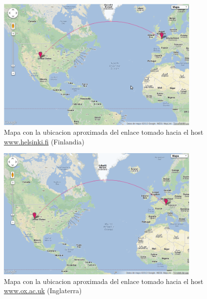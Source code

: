 \begin{figure}[H]
  \centering
    \includegraphics[width=0.9\textwidth]{imgs/finlandia_enlace_1.png}
    \caption{Mapa con la ubicacion aproximada del enlace tomado hacia el host \url{www.helsinki.fi} (Finlandia)}
    \label{fig:mapa_fin}
\end{figure}


\begin{figure}[H]
  \centering
    \includegraphics[width=0.9\textwidth]{imgs/inglaterra_enlace_1.png}
    \caption{Mapa con la ubicacion aproximada del enlace tomado hacia el host \url{www.ox.ac.uk} (Inglaterra)}
    \label{fig:mapa_ing}
\end{figure}


